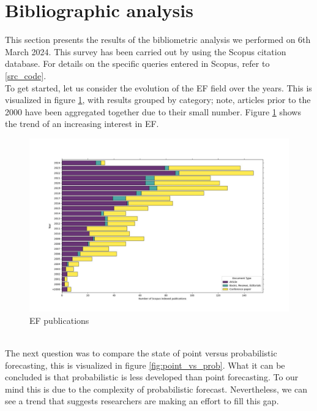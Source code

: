 \section{Bibliographic analysis}
This section presents the results of the bibliometric analysis we performed on 6th March 2024. This survey has been carried out by using the Scopus citation database. For details on the specific queries entered in Scopus, refer to \ref{src_code}.
\\
To get started, let us consider the evolution of the EF field over the years. This is visualized in figure \ref{fig:epf_evolution}, with results grouped by category; note, articles prior to the 2000 have been aggregated together due to their small number. Figure \ref{fig:epf_evolution} shows the trend of an increasing interest in EF.
\begin{figure}
    \includegraphics[width=\textwidth]{images/epf_evolution1.jpg}
    \caption{EF publications}
    \label{fig:epf_evolution}
  \end{figure}
\\
The next question was to compare the state of point versus probabilistic forecasting, this is visualized in figure \ref{fig:point_vs_prob}. What it can be concluded is that probabilistic is less developed than point forecasting. To our mind this is due to the complexity of probabilistic forecast.
Nevertheless, we can see a trend that suggests researchers are making an effort to fill this gap.
